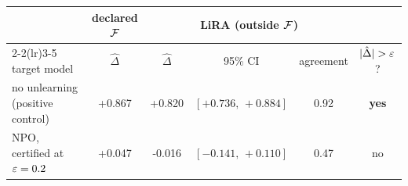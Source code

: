 \begin{tabular}{lccccc}
\toprule
& declared $\mathcal{F}$ & \multicolumn{3}{c}{LiRA (outside $\mathcal{F}$)} & \\
\cmidrule(lr){2-2}\cmidrule(lr){3-5}
target model & $\hat\Delta$ & $\hat\Delta$ & 95\% CI & agreement & $|\hat\Delta| > \varepsilon$?\\
\midrule
no unlearning (positive control) & +0.867 & +0.820 & $[+0.736,\,+0.884]$ & 0.92 & \textbf{yes}\\
NPO, certified at $\varepsilon=0.2$ & +0.047 & -0.016 & $[-0.141,\,+0.110]$ & 0.47 & no\\
\bottomrule
\end{tabular}
